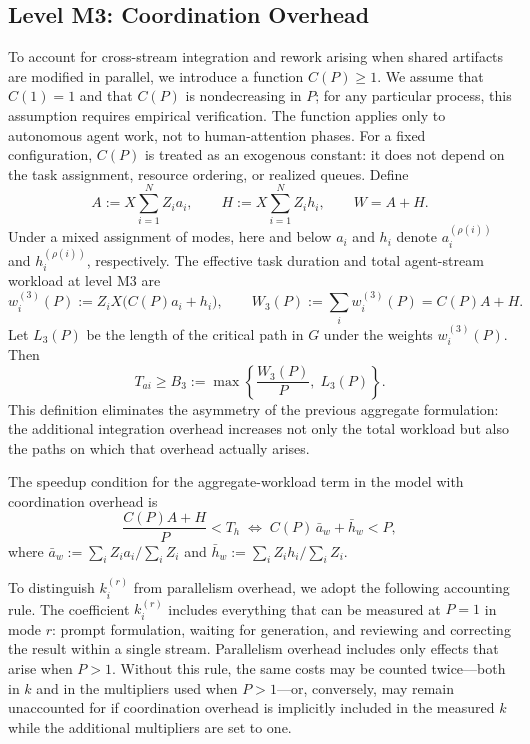 \subsection{Level M3: Coordination Overhead}

\begin{remark}\label{rem:coordination}
To account for cross-stream integration and rework arising when shared artifacts are modified in parallel, we introduce a function $C(P) \ge 1$. We assume that $C(1)=1$ and that $C(P)$ is nondecreasing in $P$; for any particular process, this assumption requires empirical verification. The function applies only to autonomous agent work, not to human-attention phases. For a fixed configuration, $C(P)$ is treated as an exogenous constant: it does not depend on the task assignment, resource ordering, or realized queues. Define
\[
  A := X\sum_{i=1}^{N}Z_i a_i, \qquad
  H := X\sum_{i=1}^{N}Z_i h_i, \qquad W=A+H.
\]
Under a mixed assignment of modes, here and below $a_i$ and $h_i$ denote
$a_i^{(\rho(i))}$ and $h_i^{(\rho(i))}$, respectively.
The effective task duration and total agent-stream workload at level M3 are
\[
  w_i^{(3)}(P):=Z_iX\bigl(C(P)a_i+h_i\bigr), \qquad
  W_3(P):=\sum_i w_i^{(3)}(P)=C(P)A+H.
\]
Let $L_3(P)$ be the length of the critical path in $G$ under the weights $w_i^{(3)}(P)$. Then
\[
  T_{ai} \ge B_3 := \max\left\{ \frac{W_3(P)}{P},\; L_3(P) \right\}.
\]
This definition eliminates the asymmetry of the previous aggregate formulation: the additional integration overhead increases not only the total workload but also the paths on which that overhead actually arises.

The speedup condition for the aggregate-workload term in the model with coordination overhead is
\[
  \frac{C(P)A+H}{P} < T_h
  \;\iff\;
  C(P)\,\bar a_w+\bar h_w<P,
\]
where $\bar a_w:=\sum_iZ_i a_i/\sum_iZ_i$ and $\bar h_w:=\sum_iZ_i h_i/\sum_iZ_i$.

To distinguish $k_i^{(r)}$ from parallelism overhead, we adopt the following accounting rule. The coefficient $k_i^{(r)}$ includes everything that can be measured at $P = 1$ in mode $r$: prompt formulation, waiting for generation, and reviewing and correcting the result within a single stream. Parallelism overhead includes only effects that arise when $P > 1$. Without this rule, the same costs may be counted twice---both in $k$ and in the multipliers used when $P > 1$---or, conversely, may remain unaccounted for if coordination overhead is implicitly included in the measured $k$ while the additional multipliers are set to one.


\end{remark}
